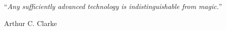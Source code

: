 \documentclass[
hidelinks,
12pt, %
oneside, %
english, %
doublespacing, %
headsepline, %
chapterinoneline, %
]{MastersDoctoralThesis} %
\begin{document}
%
%
%

\newpage 
\vspace*{0.2\textheight}

\noindent\enquote{\itshape Any sufficiently advanced technology is indistinguishable from magic.}\bigbreak

\hfill Arthur C. Clarke

\end{document}
